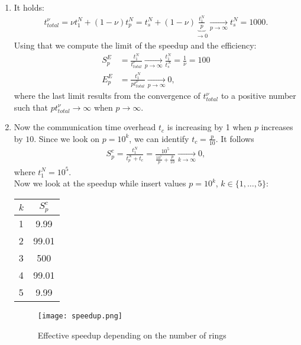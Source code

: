 \documentclass{article}
\begin{document}
\begin{enumerate}[label=(\alph*)]
  \item It holds: 
    \begin{align*}
      t^{\nu}_{total} = \nu t_1^N + (1-\nu)t_p^N = t_s^N + (1-\nu)\underbrace{\frac{t_1^N}{p}}_{\to 0} \xrightarrow[p \to \infty]{} t_s^N=1000.
    \end{align*}
    Using that we compute the limit of the speedup and the efficiency:
    \begin{align*}
      S_p^E &= \frac{t_1^N}{t_{total}^\nu}\xrightarrow[p \to \infty]{} \frac{t_1^N}{t_s^N}=\frac{1}{\nu}=100\\
      E_p^E &= \frac{t_1^N}{pt_{total}^\nu}\xrightarrow[p \to \infty]{}0,
    \end{align*}
    where the last limit results from the convergence of $t^\nu_{total}$ to a positive number such that $pt^\nu_{total}\to\infty$ when $p\to\infty$.
  \item Now the communication time overhead $t_c$ is increasing by 1 when $p$ increases by $10$. Since we look on $p=10^k$, we can identify $t_c=\frac{p}{10}$.
    It follows
    \begin{align*}
      S^c_p = \frac{t_1^N}{t_p^N+t_c} = \frac{10^5}{\frac{10^5}{p} + \frac{p}{10}} \xrightarrow[k \to \infty]{} 0,
    \end{align*}
    where $t_1^N = 10^5$.\\
    Now we look at the speedup while insert values $p=10^k$, $k\in\{1,\dots,5\}$:
    \begin{center}
      \begin{tabular}{ l | c } 
        $k$ & $S_p^c$ \\
        \hline
        1 & 9.99 \\
        2 & 99.01 \\
        3 & 500 \\
        4 & 99.01 \\
        5 & 9.99 \\
      \end{tabular}        
    \end{center}
    \begin{figure}[hbt!]
      \centering
      \texttt{[image: speedup.png]}
      \caption{Effective speedup depending on the number of rings}
    \end{figure}
\end{enumerate}
\end{document}
